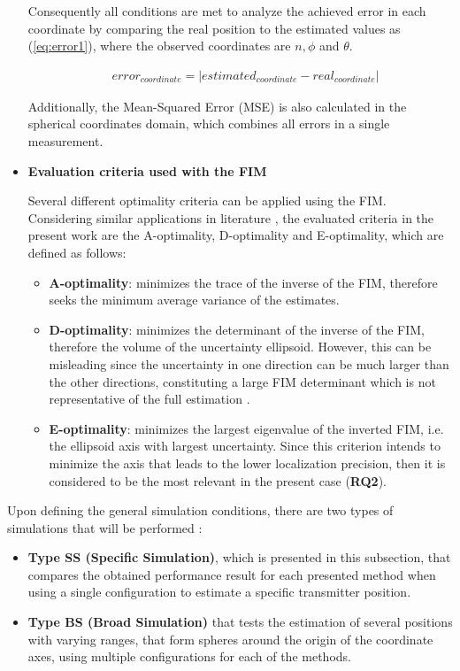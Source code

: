 \begin{itemize}
	Consequently all conditions are met to analyze the achieved error in each coordinate by comparing the real position to the estimated values as (\ref{eq:error1}), where the observed coordinates are $n, \phi$ and $\theta$.
	
	\begin{eqnarray}
		&error_{coordinate} = |estimated_{coordinate} - real_{coordinate}|
		\label{eq:error1}
	\end{eqnarray}

	Additionally, the Mean-Squared Error (MSE) is also calculated in the spherical coordinates domain, which combines all errors in a single measurement.
	
	\item \textbf{Evaluation criteria used with the FIM}
	
	Several different optimality criteria can be applied using the FIM. Considering similar applications in literature \cite{optimality-e-a-d}, the evaluated criteria in the present work are the A-optimality, D-optimality and E-optimality, which are defined as follows:
	
	\begin{itemize}
		\item \textbf{A-optimality}: minimizes the trace of the inverse of the FIM, therefore seeks the minimum average variance of the estimates.
		\item \textbf{D-optimality}: minimizes the determinant of the inverse of the FIM, therefore the volume of the uncertainty ellipsoid. However, this can be misleading since the uncertainty in one direction can be much larger than the other directions, constituting a large FIM determinant which is not representative of the full estimation \cite{d-opt-mislead}.
		\item \textbf{E-optimality}: minimizes the largest eigenvalue of the inverted FIM, i.e. the ellipsoid axis with largest uncertainty. Since this criterion intends to minimize the axis that leads to the lower localization precision, then it is considered to be the most relevant in the present case (\textbf{RQ2}).
	\end{itemize}
	
\end{itemize}

Upon defining the general simulation conditions, there are two types of simulations that will be performed :
\begin{itemize}
	\item \textbf{Type SS (Specific Simulation)}, which is presented in this subsection, that compares the obtained performance result for each presented method when using a single configuration to estimate a specific transmitter position.
	\item \textbf{Type BS (Broad Simulation)} that tests the estimation of several positions with varying ranges, that form spheres around the origin of the coordinate axes, using multiple configurations for each of the methods.
\end{itemize}

